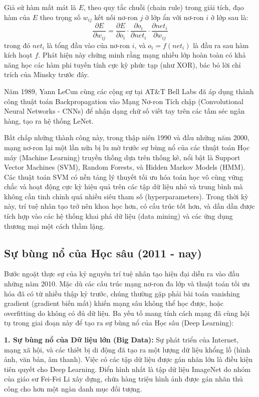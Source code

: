 \documentclass[12pt,a4paper]{article}
\begin{document}
Giả sử hàm mất mát là $E$, theo quy tắc chuỗi (chain rule) trong giải tích, đạo hàm của $E$ theo trọng số $w_{ij}$ kết nối nơ-ron $j$ ở lớp ẩn với nơ-ron $i$ ở lớp sau là:
\begin{equation}
\frac{\partial E}{\partial w_{ij}} = \frac{\partial E}{\partial o_i} \cdot \frac{\partial o_i}{\partial net_i} \cdot \frac{\partial net_i}{\partial w_{ij}}
\end{equation}
trong đó $net_i$ là tổng đầu vào của nơ-ron $i$, và $o_i = f(net_i)$ là đầu ra sau hàm kích hoạt $f$. Phát hiện này chứng minh rằng mạng nhiều lớp hoàn toàn có khả năng học các hàm phi tuyến tính cực kỳ phức tạp (như XOR), bác bỏ lời chỉ trích của Minsky trước đây.

Năm 1989, Yann LeCun cùng các cộng sự tại AT\&T Bell Labs đã áp dụng thành công thuật toán Backpropagation vào Mạng Nơ-ron Tích chập (Convolutional Neural Networks - CNNs) để nhận dạng chữ số viết tay trên các tấm séc ngân hàng, tạo ra hệ thống LeNet.

Bất chấp những thành công này, trong thập niên 1990 và đầu những năm 2000, mạng nơ-ron lại một lần nữa bị lu mờ trước sự bùng nổ của các thuật toán Học máy (Machine Learning) truyền thống dựa trên thống kê, nổi bật là Support Vector Machines (SVM), Random Forests, và Hidden Markov Models (HMM). Các thuật toán SVM có nền tảng lý thuyết tối ưu hóa toán học vô cùng vững chắc và hoạt động cực kỳ hiệu quả trên các tập dữ liệu nhỏ và trung bình mà không cần tinh chỉnh quá nhiều siêu tham số (hyperparameters). Trong thời kỳ này, trí tuệ nhân tạo trở nên khoa học hơn, có cấu trúc tốt hơn, và dần dần được tích hợp vào các hệ thống khai phá dữ liệu (data mining) và các ứng dụng thương mại một cách thầm lặng.

\newpage

\subsection{Sự bùng nổ của Học sâu (2011 - nay)}

Bước ngoặt thực sự của kỷ nguyên trí tuệ nhân tạo hiện đại diễn ra vào đầu những năm 2010. Mặc dù các cấu trúc mạng nơ-ron đa lớp và thuật toán tối ưu hóa đã có từ nhiều thập kỷ trước, chúng thường gặp phải bài toán vanishing gradient (gradient biến mất) khiến mạng sâu không thể học được, hoặc overfitting do không có đủ dữ liệu. Ba yếu tố mang tính cách mạng đã cùng hội tụ trong giai đoạn này để tạo ra sự bùng nổ của Học sâu (Deep Learning):

\textbf{1. Sự bùng nổ của Dữ liệu lớn (Big Data):} Sự phát triển của Internet, mạng xã hội, và các thiết bị di động đã tạo ra một lượng dữ liệu khổng lồ (hình ảnh, văn bản, âm thanh). Việc có các tập dữ liệu được gán nhãn lớn là điều kiện tiên quyết cho Deep Learning. Điển hình nhất là tập dữ liệu ImageNet do nhóm của giáo sư Fei-Fei Li xây dựng, chứa hàng triệu hình ảnh được gán nhãn thủ công cho hơn một ngàn danh mục đối tượng.
\end{document}
